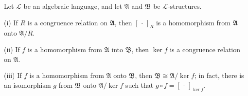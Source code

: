 Let $\mathcal{L}$ be an algebraic language, and let $\mathfrak{A}$ and $\mathfrak{B}$ be $\mathcal{L}$-structures.

(i) If $R$ is a congruence relation on $\mathfrak{A}$, then $[\,\cdot\,]_R$ is a homomorphism from $\mathfrak{A}$ onto $\mathfrak{A}/R$.

(ii) If $f$ is a homomorphism from $\mathfrak{A}$ into $\mathfrak{B}$, then $\ker f$ is a congruence relation on $\mathfrak{A}$.

(iii) If $f$ is a homomorphism from $\mathfrak{A}$ onto $\mathfrak{B}$, then $\mathfrak{B} \cong \mathfrak{A}/\ker f$; in fact, there is an isomorphism $g$ from $\mathfrak{B}$ onto $\mathfrak{A}/\ker f$ such that $g \circ f = [\,\cdot\,]_{\ker f}$.
